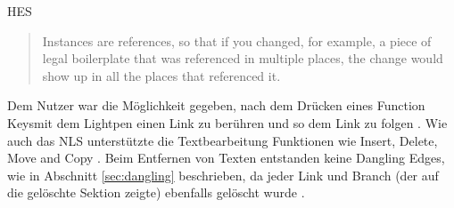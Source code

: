 \begin{section}{HES}
\begin{quote}
\glqq Instances are references, so that if you changed, for example, a piece of legal boilerplate that was referenced in multiple places, the change would show up in all the places that referenced it. \grqq{ }\cite{Dam1988}
\end{quote}

Dem Nutzer war die Möglichkeit gegeben, nach dem Drücken eines \glqq Function Keys\grqq{ }mit dem Lightpen einen Link zu berühren und so dem Link zu folgen \cite[S.23]{Dam1969}. Wie auch das NLS unterstützte die Textbearbeitung Funktionen wie Insert, Delete, Move and Copy \cite[S.10-14]{Dam1969} \cite[S. 889]{Dam1988}. Beim Entfernen von Texten entstanden keine Dangling Edges, wie in Abschnitt \ref{sec:dangling} beschrieben, da jeder Link und Branch (der auf die gelöschte Sektion zeigte) ebenfalls gelöscht wurde \cite[S.12]{Dam1969}.

\end{section}

